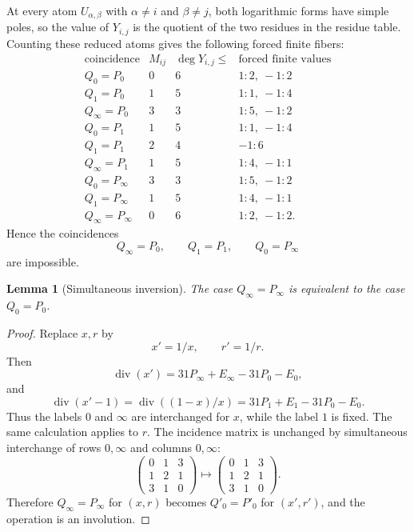 \documentclass[11pt]{amsart}
\newtheorem{lemma}[theorem]{Lemma}
\newcommand{\Div}{\operatorname{div}}
\begin{document}
At every atom \(U_{\alpha,\beta}\) with \(\alpha\ne i\) and \(\beta\ne j\),
both logarithmic forms have simple poles, so the value of \(Y_{i,j}\) is the
quotient of the two residues in the residue table.  Counting these reduced
atoms gives the following forced finite fibers:
\[
\begin{array}{c|c|c|c}
\text{coincidence} & M_{ij} & \deg Y_{i,j}\le & \text{forced finite values}\\ \hline
Q_0=P_0       &0&6& 1:2,\ -1:2\\
Q_1=P_0       &1&5& 1:1,\ -1:4\\
Q_\infty=P_0  &3&3& 1:5,\ -1:2\\
Q_0=P_1       &1&5& 1:1,\ -1:4\\
Q_1=P_1       &2&4& -1:6\\
Q_\infty=P_1  &1&5& 1:4,\ -1:1\\
Q_0=P_\infty  &3&3& 1:5,\ -1:2\\
Q_1=P_\infty  &1&5& 1:4,\ -1:1\\
Q_\infty=P_\infty&0&6&1:2,\ -1:2 .
\end{array}
\]
Hence the coincidences
\[
  Q_\infty=P_0,\qquad Q_1=P_1,\qquad Q_0=P_\infty
\]
are impossible.

\begin{lemma}[Simultaneous inversion]
\label{lem:inversion}
The case \(Q_\infty=P_\infty\) is equivalent to the case \(Q_0=P_0\).
\end{lemma}

\begin{proof}
Replace \(x,r\) by
\[
  x'=1/x,\qquad r'=1/r.
\]
Then
\[
  \Div(x')=31P_\infty+E_\infty-31P_0-E_0,
\]
and
\[
  \Div(x'-1)=\Div((1-x)/x)
  =31P_1+E_1-31P_0-E_0.
\]
Thus the labels \(0\) and \(\infty\) are interchanged for \(x\), while the
label \(1\) is fixed.  The same calculation applies to \(r\).  The incidence
matrix is unchanged by simultaneous interchange of rows \(0,\infty\) and
columns \(0,\infty\):
\[
  \begin{pmatrix}
  0&1&3\\1&2&1\\3&1&0
  \end{pmatrix}
  \longmapsto
  \begin{pmatrix}
  0&1&3\\1&2&1\\3&1&0
  \end{pmatrix}.
\]
Therefore \(Q_\infty=P_\infty\) for \((x,r)\) becomes \(Q'_0=P'_0\) for
\((x',r')\), and the operation is an involution.
\end{proof}
\end{document}
